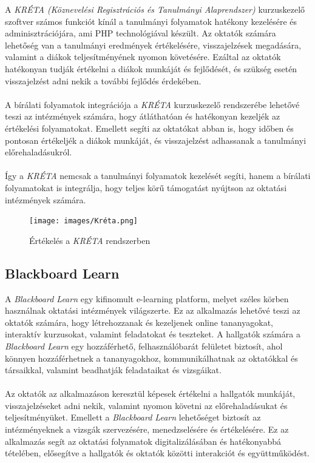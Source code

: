A \textit{KRÉTA (Köznevelési Regisztrációs és Tanulmányi Alaprendszer)} \cite{kreta} kurzuskezelő szoftver számos funkciót kínál a tanulmányi folyamatok hatékony kezelésére és adminisztrációjára, ami PHP \cite{PHP} technológiával készült. Az oktatók számára lehetőség van a tanulmányi eredmények értékelésére, visszajelzések megadására, valamint a diákok teljesítményének nyomon követésére. Ezáltal az oktatók hatékonyan tudják értékelni a diákok munkáját és fejlődését, és szükség esetén visszajelzést adni nekik a további fejlődés érdekében.\\
\\
A bírálati folyamatok integrációja a \textit{KRÉTA} kurzuskezelő rendszerébe lehetővé teszi az intézmények számára, hogy átláthatóan és hatékonyan kezeljék az értékelési folyamatokat. Emellett segíti az oktatókat abban is, hogy időben és pontosan értékeljék a diákok munkáját, és visszajelzést adhassanak a tanulmányi előrehaladásukról.\\
\\
Így a \textit{KRÉTA} nemcsak a tanulmányi folyamatok kezelését segíti, hanem a bírálati folyamatokat is integrálja, hogy teljes körű támogatást nyújtson az oktatási intézmények számára.
\begin{figure}[h]
\centering
\texttt{[image: images/Kréta.png]}
\caption{Értékelés a \textit{KRÉTA} rendszerben\cite{kreta_jegy}}
\label{fig:kreta}
\end{figure}
\newpage
\subsection{Blackboard Learn}

A \textit{Blackboard Learn} \cite{blackboard_learn} egy kifinomult e-learning platform, melyet széles körben használnak oktatási intézmények világszerte. Ez az alkalmazás lehetővé teszi az oktatók számára, hogy létrehozzanak és kezeljenek online tananyagokat, interaktív kurzusokat, valamint feladatokat és teszteket. A hallgatók számára a \textit{Blackboard Learn} egy hozzáférhető, felhasználóbarát felületet biztosít, ahol könnyen hozzáférhetnek a tananyagokhoz, kommunikálhatnak az oktatókkal és társaikkal, valamint beadhatják feladataikat és vizsgáikat.\\
\\ Az oktatók az alkalmazáson keresztül képesek értékelni a hallgatók munkáját, visszajelzéseket adni nekik, valamint nyomon követni az előrehaladásukat és teljesítményüket. Emellett a \textit{Blackboard Learn} lehetőséget biztosít az intézményeknek a vizsgák szervezésére, menedzselésére és értékelésére. Ez az alkalmazás segít az oktatási folyamatok digitalizálásában és hatékonyabbá tételében, elősegítve a hallgatók és oktatók közötti interakciót és együttműködést.

